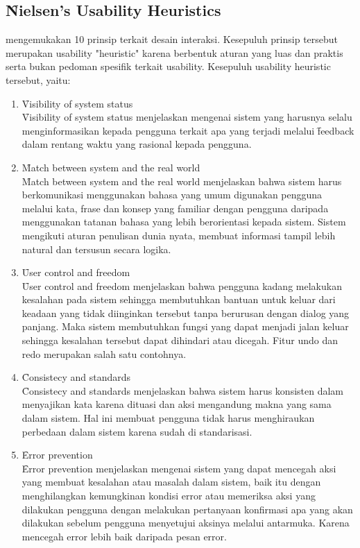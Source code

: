 \subsection{\f{Nielsen's Usability Heuristics}}
\citet{} mengemukakan 10 prinsip terkait desain interaksi. Kesepuluh prinsip tersebut merupakan usability "heuristic" karena berbentuk aturan yang luas dan praktis serta bukan pedoman spesifik terkait usability. Kesepuluh usability heuristic tersebut, yaitu:
\begin{enumerate}
	\item \f{Visibility of system status}\\
	\f{Visibility of system status} menjelaskan mengenai sistem yang harusnya selalu menginformasikan kepada pengguna terkait apa yang terjadi melalui \f{feedback} dalam rentang waktu yang rasional kepada pengguna.
	\item \f{Match between system and the real world}\\
	\f{Match between system and the real world} menjelaskan bahwa sistem harus berkomunikasi menggunakan bahasa yang umum digunakan pengguna melalui kata, frase dan konsep yang familiar dengan pengguna daripada menggunakan tatanan bahasa yang lebih berorientasi kepada sistem. Sistem mengikuti aturan penulisan dunia nyata, membuat informasi tampil lebih natural dan tersusun secara logika.
	\item \f{User control and freedom}\\
	\f{User control and freedom} menjelaskan bahwa pengguna kadang melakukan kesalahan pada sistem sehingga membutuhkan bantuan untuk keluar dari keadaan yang tidak diinginkan tersebut tanpa berurusan dengan dialog yang panjang. Maka sistem membutuhkan fungsi yang dapat menjadi jalan keluar sehingga kesalahan tersebut dapat dihindari atau dicegah. Fitur undo dan redo merupakan salah satu contohnya.
	\item \f{Consistecy and standards}\\
	\f{Consistecy and standards} menjelaskan bahwa sistem harus konsisten dalam menyajikan kata karena dituasi dan aksi mengandung makna yang sama dalam sistem. Hal ini membuat pengguna tidak harus menghiraukan perbedaan dalam sistem karena sudah di standarisasi.
	\item \f{Error prevention}\\
	\f{Error prevention} menjelaskan mengenai sistem yang dapat mencegah aksi yang membuat kesalahan atau masalah dalam sistem, baik itu dengan menghilangkan kemungkinan kondisi error atau memeriksa aksi yang dilakukan pengguna dengan melakukan pertanyaan konfirmasi apa yang akan dilakukan sebelum pengguna menyetujui aksinya melalui antarmuka. Karena mencegah error lebih baik daripada pesan error.

\end{enumerate}
